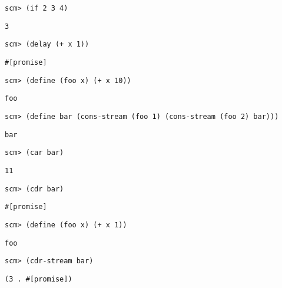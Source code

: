 \documentclass{exam}
\begin{document}
\begin{questions}
\begin{blocksection}
\begin{lstlisting}
scm> (if 2 3 4)
\end{lstlisting}
\begin{solution}[.25in]
\texttt{3}
\end{solution}

\begin{lstlisting}
scm> (delay (+ x 1))
\end{lstlisting}
\begin{solution}[.25in]
\texttt{#[promise]}
\end{solution}

\begin{lstlisting}
scm> (define (foo x) (+ x 10))
\end{lstlisting}
\begin{solution}[.25in]
\texttt{foo}
\end{solution}

\begin{lstlisting}
scm> (define bar (cons-stream (foo 1) (cons-stream (foo 2) bar)))
\end{lstlisting}
\begin{solution}[.25in]
\texttt{bar}
\end{solution}

\begin{lstlisting}
scm> (car bar)
\end{lstlisting}
\begin{solution}[.25in]
\texttt{11}
\end{solution}
\end{blocksection}

\begin{blocksection}
\begin{lstlisting}
scm> (cdr bar)
\end{lstlisting}
\begin{solution}[.25in]
\texttt{#[promise]}
\end{solution}

\begin{lstlisting}
scm> (define (foo x) (+ x 1))
\end{lstlisting}
\begin{solution}[.25in]
\texttt{foo}
\end{solution}

\begin{lstlisting}
scm> (cdr-stream bar)
\end{lstlisting}
\begin{solution}[.25in]
\texttt{(3 . #[promise])}
\end{solution}


\end{blocksection}
\end{questions}
\end{document}
